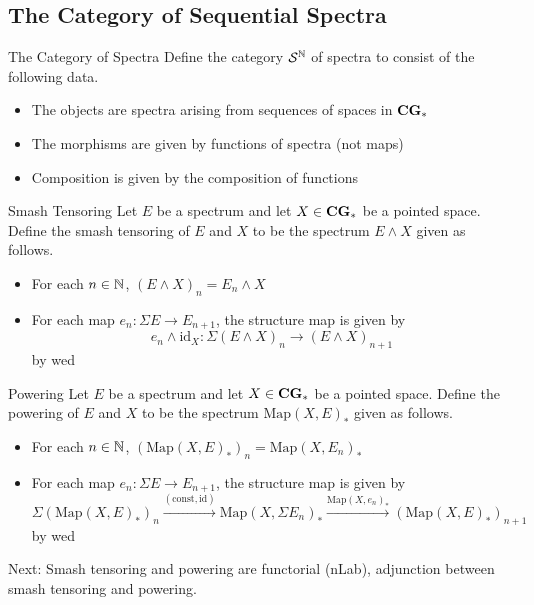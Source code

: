 \documentclass[a4paper]{article}
\begin{document}
\subsection{The Category of Sequential Spectra}
\begin{defn}{The Category of Spectra}{} Define the category $\mathcal{S}^{\mathbb{N}}$ of spectra to consist of the following data. 
\begin{itemize}
\item The objects are spectra arising from sequences of spaces in $\bold{CG}_\ast$
\item The morphisms are given by functions of spectra (not maps)
\item Composition is given by the composition of functions
\end{itemize}
\end{defn}

\begin{defn}{Smash Tensoring}{} Let $E$ be a spectrum and let $X\in\bold{CG}_\ast$ be a pointed space. Define the smash tensoring of $E$ and $X$ to be the spectrum $E\wedge X$ given as follows. 
\begin{itemize}
\item For each $n\in\mathbb{N}$, $(E\wedge X)_n=E_n\wedge X$
\item For each map $e_n:\Sigma E\to E_{n+1}$, the structure map is given by $$e_n\wedge\text{id}_X:\Sigma(E\wedge X)_n\to(E\wedge X)_{n+1}$$ by wed
\end{itemize}
\end{defn}

\begin{defn}{Powering}{} Let $E$ be a spectrum and let $X\in\bold{CG}_\ast$ be a pointed space. Define the powering of $E$ and $X$ to be the spectrum $\text{Map}(X,E)_\ast$ given as follows. 
\begin{itemize}
\item For each $n\in\mathbb{N}$, $(\text{Map}(X,E)_\ast)_n=\text{Map}(X,E_n)_\ast$
\item For each map $e_n:\Sigma E\to E_{n+1}$, the structure map is given by $$\Sigma(\text{Map}(X,E)_\ast)_n\overset{(\text{const},\text{id})}{\longrightarrow}\text{Map}(X,\Sigma E_n)_\ast\overset{\text{Map}(X,e_n)_\ast}{\longrightarrow}(\text{Map}(X,E)_\ast)_{n+1}$$ by wed
\end{itemize}
\end{defn}

Next: Smash tensoring and powering are functorial (nLab), adjunction between smash tensoring and powering. 
\end{document}
